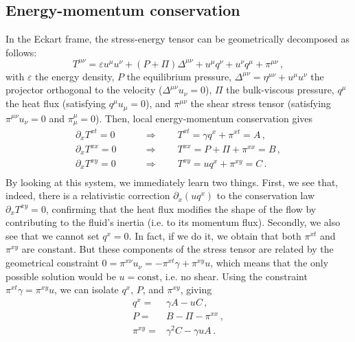 \documentclass[a4paper, amsfonts, amssymb, amsmath, reprint, showkeys, nofootinbib, twoside,notitlepage,onecolumn]{revtex4-1}
\theoremstyle{definition}
\theoremstyle{theorem}
\begin{document}
\vspace{-0.2cm}
\subsection{Energy-momentum conservation}
\vspace{-0.2cm}

In the Eckart frame, the stress-energy tensor can be geometrically decomposed as follows:
\begin{equation}\label{TimunuF}
T^{\mu \nu}=\varepsilon u^\mu u^\nu +(P+\Pi)\Delta^{\mu \nu}+u^\mu q^\nu +u^\nu q^\mu +\pi^{\mu \nu} \, ,
\end{equation}
with $\varepsilon$ the energy density, $P$ the equilibrium pressure, $\Delta^{\mu \nu}=\eta^{\mu \nu}+u^\mu u^\nu$ the projector orthogonal to the velocity ($\Delta^{\mu\nu}u_\nu=0$), $\Pi$ the bulk-viscous pressure, $q^\mu$ the heat flux (satisfying $q^\mu u_\mu =0$), and $\pi^{\mu \nu}$ the shear stress tensor (satisfying $\pi^{\mu \nu}u_\nu =0$ and $\pi^\mu_\mu=0$).  Then, local energy-momentum conservation gives
\begin{equation}\label{ABC}
\begin{split}
\partial_x T^{xt}=0 & \qquad \Longrightarrow \qquad T^{xt}=\gamma q^x +\pi^{xt}=A \, , \\
\partial_x T^{xx}=0 & \qquad \Longrightarrow \qquad T^{xx}=P+\Pi  +\pi^{xx}=B \, , \\
\partial_x T^{xy}=0 & \qquad \Longrightarrow \qquad  T^{xy}=u q^x +\pi^{xy}=C \, .\\
\end{split}
\end{equation}
By looking at this system, we immediately learn two things. First, we see that, indeed, there is a relativistic correction $\partial_{x}(uq^x)$ to the conservation law $\partial_x T^{xy}=0$, confirming that the heat flux modifies the shape of the flow by contributing to the fluid's inertia (i.e. to its momentum flux). Secondly, we also see that we cannot set $q^x=0$. In fact, if we do it, we obtain that both $\pi^{xt}$ and $\pi^{xy}$ are constant. But these components of the stress tensor are related by the geometrical constraint $0=\pi^{x\nu}u_\nu=-\pi^{xt}\gamma+\pi^{xy}u$, which means that the only possible solution would be $u=\text{const}$, i.e. no shear.
\newpage
Using the constraint $\pi^{xt}\gamma=\pi^{xy}u$, we can isolate $q^x$, $P$, and $\pi^{xy}$, giving
\vspace{-0.1cm}
\begin{equation}\label{prima}
\begin{split}
q^x={}& \gamma A- uC \, ,\\
P={}& B-\Pi -\pi^{xx} \, , \\
\pi^{xy}={}& \gamma^2 C-\gamma u A \, .\\
\end{split}
\end{equation}
\end{document}
